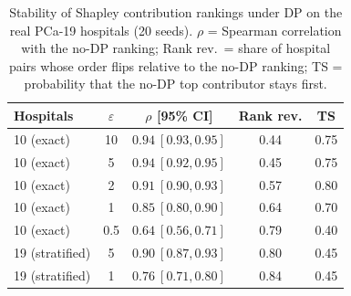 \begin{table}[t]
\caption{Stability of Shapley contribution rankings under DP on the real PCa-19 hospitals (20 seeds). $\rho$ = Spearman correlation with the no-DP ranking; Rank rev.\ = share of hospital pairs whose order flips relative to the no-DP ranking; TS = probability that the no-DP top contributor stays first.}
\centering\scriptsize
\begin{tabular}{lcccc}
\toprule
Hospitals & $\varepsilon$ & $\rho$ [95\% CI] & Rank rev. & TS \\
\midrule
10 (exact) & 10 & $0.94\ [0.93, 0.95]$ & 0.44 & 0.75 \\
10 (exact) & 5 & $0.94\ [0.92, 0.95]$ & 0.45 & 0.75 \\
10 (exact) & 2 & $0.91\ [0.90, 0.93]$ & 0.57 & 0.80 \\
10 (exact) & 1 & $0.85\ [0.80, 0.90]$ & 0.64 & 0.70 \\
10 (exact) & 0.5 & $0.64\ [0.56, 0.71]$ & 0.79 & 0.40 \\
19 (stratified) & 5 & $0.90\ [0.87, 0.93]$ & 0.80 & 0.45 \\
19 (stratified) & 1 & $0.76\ [0.71, 0.80]$ & 0.84 & 0.45 \\
\bottomrule
\end{tabular}
\label{tab:pca19_shapley}
\end{table}
